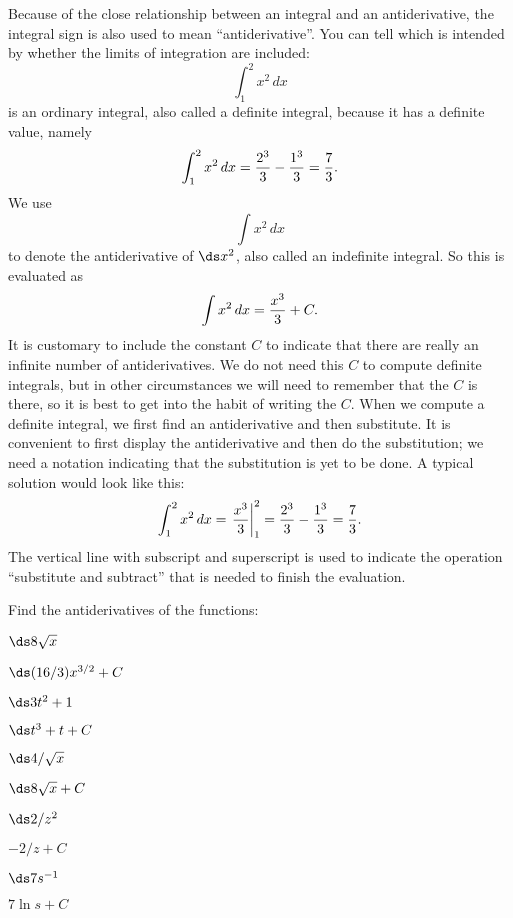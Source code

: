 \begin{theorem}
Because of the close relationship between an integral and an
antiderivative, the integral sign is also used to mean
``antiderivative''. You can tell which is intended by whether the
limits of integration are included:
$$
  \int_1^2 x^2\,dx
$$
is an ordinary integral, also called a 
{\dfont definite integral\/},
because it has a definite value, namely
$$
  \int_1^2 x^2\,dx={2^3\over3}-{1^3\over3}={7\over3}.
$$
We use
$$
  \int x^2\,dx
$$
to denote the antiderivative of $\ds x^2$, also called an
{\dfont indefinite integral\/}.
So this is evaluated as
$$
  \int x^2\,dx = {x^3\over 3}+C.
$$
It is customary to include the constant $C$ to indicate that there are
really an infinite number of antiderivatives. We do not need this $C$
to compute definite integrals, but in other circumstances we will need
to remember that the $C$ is there, so it is best to get into the habit
of writing the $C$.
When we compute a definite integral, we first find an antiderivative
and then substitute. It is convenient to first display the
antiderivative and then do the substitution; we need a notation
indicating that the substitution is yet to be done. A typical solution
would look like this:
$$
  \int_1^2 x^2\,dx=\left.{x^3\over 3}\right|_1^2 = 
  {2^3\over3}-{1^3\over3}={7\over3}.
$$
The vertical line with subscript and superscript is used to indicate
the operation ``substitute and subtract'' that is needed to finish the
evaluation. 

\begin{exercises}

Find the antiderivatives of the functions:

\twocol

\exercise $\ds 8\sqrt{x}$
\begin{answer} $\ds (16/3)x^{3/2}+C$
\end{answer}

\exercise $\ds 3t^2+1$
\begin{answer} $\ds t^3+t+C$
\end{answer}

\exercise $\ds 4/\sqrt{x}$
\begin{answer} $\ds 8\sqrt{x}+C$
\end{answer}

\exercise $\ds 2/z^2$
\begin{answer} $-2/z+C$
\end{answer}

\iflatetranscendentals
\else
\exercise $\ds 7s^{-1}$
\begin{answer} $7\ln s+C$
\end{answer}
\fi


\end{exercises}
\end{theorem}
